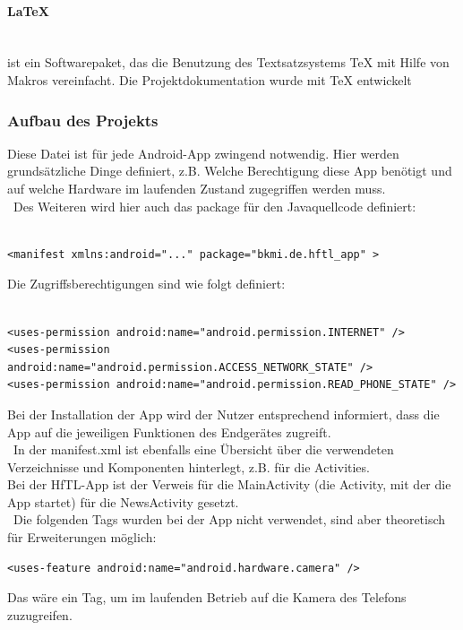 \paragraph{\LaTeX{}}
\ \\[1em]
ist ein Softwarepaket, das die Benutzung des Textsatzsystems TeX mit Hilfe von Makros vereinfacht. 
Die Projektdokumentation wurde mit TeX entwickelt 

\newpage

\subsubsection{Aufbau des Projekts}
Diese Datei ist für jede Android-App zwingend notwendig. Hier werden grundsätzliche Dinge definiert, z.B. Welche Berechtigung diese App benötigt und auf welche Hardware im laufenden Zustand zugegriffen werden muss.
\\\
Des Weiteren wird hier auch das package für den Javaquellcode definiert:\\\
\lstset{language=XML}
\begin{lstlisting}[caption={AndroidManifest.XML},label=package, frame=single]
<manifest xmlns:android="..." package="bkmi.de.hftl_app" >
\end{lstlisting}
Die Zugriffsberechtigungen sind wie folgt definiert:\\\

\begin{lstlisting}[caption={AndroidManifest.XML},label=permissions, frame=single]
<uses-permission android:name="android.permission.INTERNET" />
<uses-permission android:name="android.permission.ACCESS_NETWORK_STATE" />
<uses-permission android:name="android.permission.READ_PHONE_STATE" />
\end{lstlisting}
Bei der Installation der App wird der Nutzer entsprechend informiert, dass die App auf die jeweiligen Funktionen des Endgerätes zugreift.
 \\\
In der manifest.xml ist ebenfalls eine Übersicht über die verwendeten Verzeichnisse und Komponenten hinterlegt, z.B. für die Activities.\\
Bei der HfTL-App ist der Verweis für die MainActivity (die Activity, mit der die App startet) für die NewsActivity gesetzt.
 \\\ 
Die folgenden Tags wurden bei der App nicht verwendet, sind aber theoretisch für Erweiterungen möglich:
\begin{lstlisting}[caption={Zugriffsbeispiel},label=perm-examble, frame=single]
<uses-feature android:name="android.hardware.camera" />
\end{lstlisting}
Das wäre ein Tag, um im laufenden Betrieb auf die Kamera des Telefons zuzugreifen.

